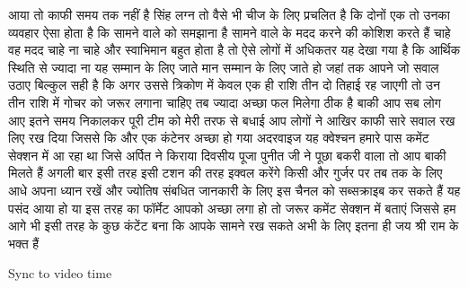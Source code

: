 आया तो काफी समय तक नहीं है सिंह लग्न तो वैसे भी चीज के लिए प्रचलित है कि दोनों एक तो उनका व्यवहार ऐसा होता है कि सामने
वाले को समझाना है सामने वाले के मदद करने की कोशिश करते हैं चाहे वह मदद चाहे ना चाहे और स्वाभिमान बहुत होता है तो ऐसे
लोगों में अधिकतर यह देखा गया है कि आर्थिक स्थिति से ज्यादा ना यह सम्मान के लिए जाते मान सम्मान के लिए जाते हो जहां
तक आपने जो सवाल उठाए बिल्कुल सही है कि अगर उससे त्रिकोण में केवल एक ही राशि तीन दो तिहाई रह जाएगी तो उन तीन राशि में
गोचर को जरूर लगाना चाहिए तब ज्यादा अच्छा फल मिलेगा ठीक है बाकी आप सब लोग आए इतने समय निकालकर पूरी टीम को मेरी तरफ से बधाई
आप लोगों ने आखिर काफी सारे सवाल रख लिए रख दिया जिससे कि और एक कंटेनर अच्छा हो गया अदरवाइज यह क्वेश्चन हमारे पास कमेंट सेक्शन में आ रहा था जिसे अर्पित ने
किराया दिवसीय पूजा पुनीत जी ने पूछा बकरी वाला तो आप बाकी मिलते हैं अगली बार इसी तरह इसी टशन की तरह इक्वल करेंगे किसी और
गुर्जर पर तब तक के लिए आधे अपना ध्यान रखें और ज्योतिष संबधित जानकारी के लिए इस चैनल को सब्सक्राइब कर सकते हैं यह पसंद
आया हो या इस तरह का फॉर्मेट आपको अच्छा लगा हो तो जरूर कमेंट सेक्शन में बताएं जिससे हम आगे भी इसी तरह के कुछ कंटेंट बना कि आपके सामने रख सकते अभी के लिए
इतना ही जय श्री राम के भक्त हैं

Sync to video time
